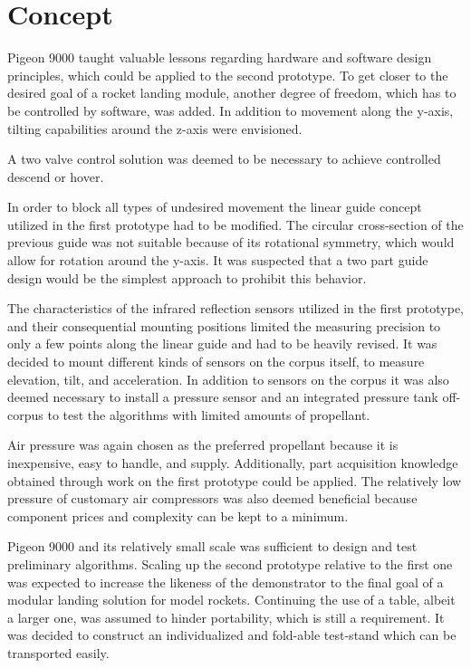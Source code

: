 \section{Concept}

Pigeon 9000 taught valuable lessons regarding hardware and software design principles, which could be applied to the second prototype. To get closer to the desired goal of a rocket landing module, another degree of freedom, which has to be controlled by software, was added. In addition to movement along the y-axis, tilting capabilities around the z-axis were envisioned. 

A two valve control solution was deemed to be necessary to achieve controlled descend or hover. 

In order to block all types of undesired movement the linear guide concept utilized in the first prototype had to be modified. The circular cross-section of the previous guide was not suitable because of its rotational symmetry, which would allow for rotation around the y-axis. It was suspected that a two part guide design would be the simplest approach to prohibit this behavior.

The characteristics of the infrared reflection sensors utilized in the first prototype, and their consequential mounting positions  limited the measuring precision to only a few points along the linear guide and had to be heavily revised. It was decided to mount different kinds of sensors on the corpus itself, to measure elevation, tilt, and acceleration. In addition to sensors on the corpus it was also deemed necessary to install a pressure sensor and an integrated pressure tank off-corpus to test the algorithms with limited amounts of propellant.

Air pressure was again chosen as the preferred propellant because it is inexpensive, easy to handle, and supply. Additionally, part acquisition knowledge obtained through work on the first prototype could be applied. The relatively low pressure of customary air compressors was also deemed beneficial because component prices and complexity can be kept to a minimum.

Pigeon 9000 and its relatively small scale was sufficient to design and test preliminary algorithms. Scaling up the second prototype relative to the first one was expected to increase the likeness of the demonstrator to the final goal of a modular landing solution for model rockets. Continuing the use of a table, albeit a larger one, was assumed to hinder portability, which is still a requirement. It was decided to construct an individualized and fold-able test-stand which can be transported easily.

